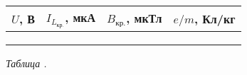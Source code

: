 \begin{center}
    \hypertarget{table3}{}

    \renewcommand{\arraystretch}{1.8}

    \begin{tabular}{|c|C{2.5cm}|C{2.5cm}|C{1.8cm}|}
        \hline
        $U$, В & $I_{L_{\text{кр.}}}$, мкА & $B_\text{кр.}$, мкТл & $e/m$, Кл/кг  \\
        \hline
        & & & \\
        \hline
        & & & \\
        \hline
        & & & \\
        \hline
    \end{tabular}

    \smallvspace

    \textit{Таблица .} 

\end{center}